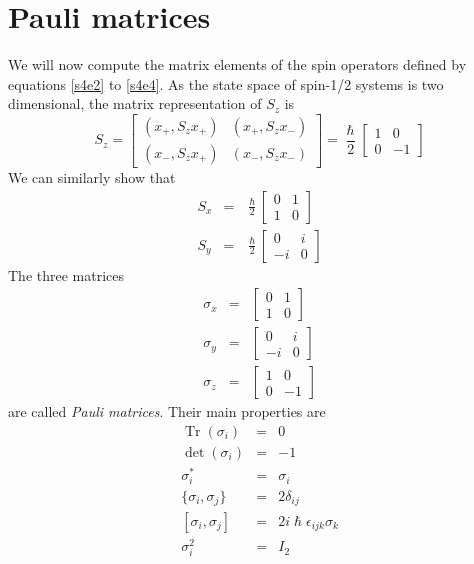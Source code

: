 \documentclass{article}
\numberwithin{equation}{section}
\DeclareMathOperator{\Tr}{Tr}
\theoremstyle{plain}
\numberwithin{thm}{section}
\theoremstyle{plain}
\numberwithin{prop}{section}
\theoremstyle{definition}
\numberwithin{defn}{section}
\theoremstyle{remark}
\begin{document}
\section{Pauli matrices}\label{s5}
We will now compute the matrix elements of the spin operators defined by
equations \eqref{s4e2} to \eqref{s4e4}. As the state space of spin-1/2 systems
is two dimensional, the matrix representation of $S_z$ is
\begin{equation}\label{s5e1}
S_z = \begin{bmatrix} (x_+, S_z x_+) & (x_+, S_z x_-) \\
(x_-, S_z x_+) & (x_-, S_z x_-) 
\end{bmatrix} = \frac{\hslash}{2}\begin{bmatrix} 1 & 0 \\ 0 & -1\end{bmatrix}
\end{equation}
We can similarly show that
\begin{eqnarray}
S_x &=& \frac{\hslash}{2}\begin{bmatrix}0 & 1 \\ 1 & 0 \end{bmatrix}
\label{s5e2} \\
S_y &=& \frac{\hslash}{2}\begin{bmatrix}0 & i \\ -i & 0 \end{bmatrix}
\label{s5e3}
\end{eqnarray}
The three matrices
\begin{eqnarray}
\sigma_x &=& \begin{bmatrix}0 & 1 \\ 1 & 0\end{bmatrix} \label{s5e4} \\
\sigma_y &=& \begin{bmatrix}0 & i \\ -i & 0\end{bmatrix} \label{s5e5} \\
\sigma_z &=& \begin{bmatrix}1 & 0 \\ 0 & -1\end{bmatrix} \label{s5e6}
\end{eqnarray}
are called \emph{Pauli matrices}. Their main properties are
\begin{eqnarray}
\Tr(\sigma_i) &=& 0 \label{s5e7} \\
\det(\sigma_i) &=& -1 \label{s5e8} \\
\sigma_i^\ast &=& \sigma_i \label{s5e9} \\
\{\sigma_i, \sigma_j\} &=& 2\delta_{ij} \label{s5e10} \\
{}[\sigma_i, \sigma_j] &=& 2i\hslash\epsilon_{ijk}\sigma_k \label{s5e11} \\
\sigma_i^2 &=& I_2 \label{s5e12}
\end{eqnarray}
\end{document}
